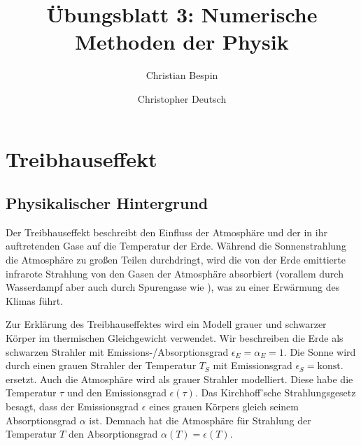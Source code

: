 \documentclass[10pt,a4paper]{article}
\author{Christian Bespin \and Christopher Deutsch}
\title{Übungsblatt 3: Numerische Methoden der Physik}
\begin{document}
\maketitle

\setcounter{section}{1}

\section{Treibhauseffekt}

\subsection{Physikalischer Hintergrund}
Der Treibhauseffekt beschreibt den Einfluss der Atmosphäre und der in ihr
auftretenden Gase auf die Temperatur der Erde. Während die Sonnenstrahlung die
Atmosphäre zu großen Teilen durchdringt, wird die von der Erde emittierte
infrarote Strahlung von den Gasen der Atmosphäre absorbiert (vorallem durch Wasserdampf
aber auch durch Spurengase wie ), was zu einer Erwärmung des Klimas führt.

Zur Erklärung des Treibhauseffektes wird ein Modell grauer und schwarzer Körper
im thermischen Gleichgewicht verwendet. Wir beschreiben die Erde als schwarzen
Strahler mit Emissions-/Absorptionsgrad $\epsilon_E = \alpha_E = 1$. Die Sonne 
wird durch einen grauen Strahler der Temperatur $T_S$ mit Emissionsgrad
$\epsilon_S = \text{konst.}$ ersetzt.
Auch die Atmosphäre wird als grauer Strahler modelliert. Diese habe die
Temperatur $\tau$ und den Emissionsgrad $\epsilon(\tau)$. 
Das Kirchhoff'sche Strahlungsgesetz besagt, dass der Emissionsgrad $\epsilon$ eines
grauen Körpers gleich seinem Absorptionsgrad $\alpha$ ist. Demnach hat die
Atmosphäre für Strahlung der Temperatur $T$ den Absorptionsgrad $\alpha(T) = \epsilon(T)$.
\end{document}
